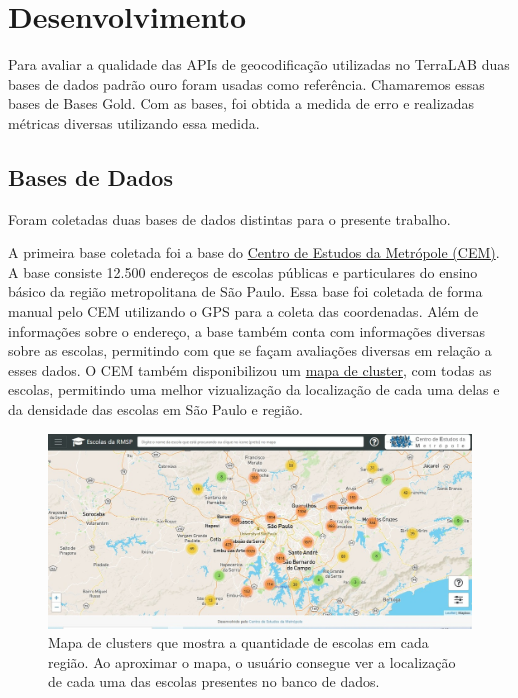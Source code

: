 \chapter{Desenvolvimento} \label{desenvolvimento}


Para avaliar a qualidade das APIs de geocodificação utilizadas no TerraLAB duas bases de dados padrão ouro foram usadas como referência. Chamaremos essas bases de Bases Gold. Com as bases, foi obtida a medida de erro e realizadas métricas diversas utilizando essa medida.


\section{Bases de Dados}
Foram coletadas duas bases de dados distintas para o presente trabalho.

A primeira base coletada foi a base do \href{https://centrodametropole.fflch.usp.br/pt-br}{Centro de Estudos da Metrópole (CEM)}. A base consiste 12.500 endereços de escolas públicas e particulares do ensino básico da região metropolitana de São Paulo. Essa base foi coletada de forma manual pelo CEM utilizando o GPS para a coleta das coordenadas. Além de informações sobre o endereço, a base também conta com informações diversas sobre as escolas, permitindo com que se façam avaliações diversas em relação a esses dados. O CEM também disponibilizou um \href{http://200.144.244.241:3002/geolocation}{mapa de cluster}, com todas as escolas, permitindo uma melhor vizualização da localização de cada uma delas e da densidade das escolas em São Paulo e região.

\begin{figure}
    \centering
    \includegraphics[width=\textwidth]{Figuras/siteCEM.jpeg}
    \caption{Mapa de clusters que mostra a quantidade de escolas em cada região. Ao aproximar o mapa, o usuário consegue ver a localização de cada uma das escolas presentes no banco de dados.}
    \label{fig:siteCEM}
\end{figure}

